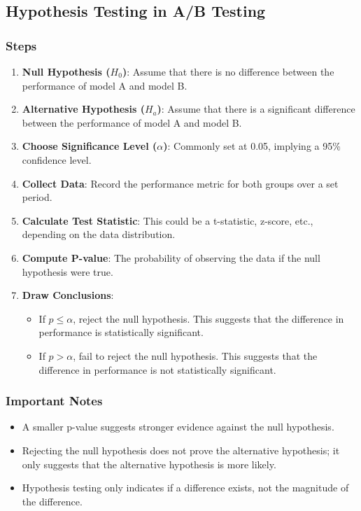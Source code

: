 \documentclass[english, threecolumn]{latex4ei/latex4ei_sheet}
\begin{document}
\begin{sectionbox}
\subsection{Hypothesis Testing in A/B Testing}
\subsubsection{Steps}
\begin{enumerate}
    \item \textbf{Null Hypothesis (\(H_0\))}: Assume that there is no difference between the performance of model A and model B.
    \item \textbf{Alternative Hypothesis (\(H_a\))}: Assume that there is a significant difference between the performance of model A and model B.
    \item \textbf{Choose Significance Level (\(\alpha\))}: Commonly set at 0.05, implying a 95\% confidence level.
    \item \textbf{Collect Data}: Record the performance metric for both groups over a set period.
    \item \textbf{Calculate Test Statistic}: This could be a t-statistic, z-score, etc., depending on the data distribution.
    \item \textbf{Compute P-value}: The probability of observing the data if the null hypothesis were true.
    \item \textbf{Draw Conclusions}:
    \begin{itemize}
        \item If \( p \leq \alpha \), reject the null hypothesis. This suggests that the difference in performance is statistically significant.
        \item If \( p > \alpha \), fail to reject the null hypothesis. This suggests that the difference in performance is not statistically significant.
    \end{itemize}
\end{enumerate}

\subsubsection{Important Notes}
\begin{itemize}
    \item A smaller p-value suggests stronger evidence against the null hypothesis.
    \item Rejecting the null hypothesis does not prove the alternative hypothesis; it only suggests that the alternative hypothesis is more likely.
    \item Hypothesis testing only indicates if a difference exists, not the magnitude of the difference.
\end{itemize}

\end{sectionbox}

\end{document}
